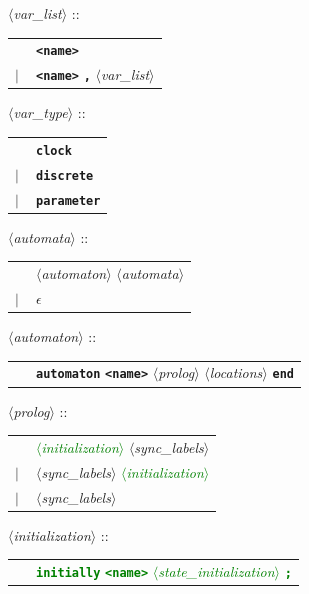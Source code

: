 \documentclass[a4paper,10pt]{article}
\newcommand{\emptystring}{$\epsilon$}
\newcommand{\nt}[1]{$\langle$\emph{#1}$\rangle$}
\newcommand{\regleGrammaire}[1]{\bigskip \noindent \nt{#1} :: \\}
\newcommand{\npec}[1]{\textcolor{green}{#1}}
\newcommand{\code}[1]{\textbf{\texttt{#1}}}
\begin{document}
\regleGrammaire{var\_list}
\begin{tabular}{l l}
	\  & \code{<name>} \\
	$|$ & \code{<name>} \code{,} \nt{var\_list}
\end{tabular}

\regleGrammaire{var\_type}
\begin{tabular}{l l}
	\  & \code{clock} \\
	$|$ & \code{discrete} \\
	$|$ & \code{parameter} \\
\end{tabular}

\regleGrammaire{automata}
\begin{tabular}{l l}
	\  & \nt{automaton} \nt{automata} \\
	$|$ & \emptystring \\
\end{tabular}

\regleGrammaire{automaton}
\begin{tabular}{l l}
	\  & \code{automaton} \code{<name>} \nt{prolog} \nt{locations} \code{end} \\
\end{tabular}

\regleGrammaire{prolog}
\begin{tabular}{l l}
	\  & \npec{\nt{initialization}} \nt{sync\_labels} \\
	$|$ & \nt{sync\_labels} \npec{\nt{initialization}} \\
	$|$ & \nt{sync\_labels} \\
\end{tabular}

\regleGrammaire{initialization}
\npec{
\begin{tabular}{l l}
	\  & \code{initially} \code{<name>} \nt{state\_initialization} \code{;} \\
\end{tabular}
}
\end{document}
